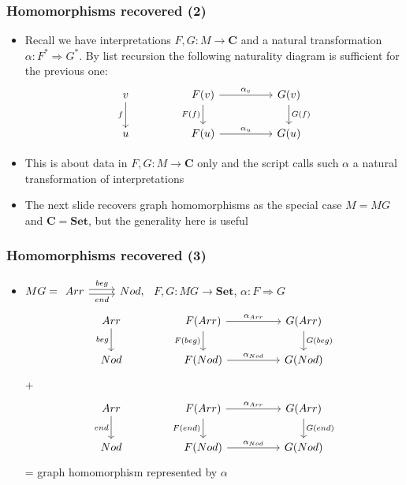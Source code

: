 \documentclass[handout]{beamer}
\newcommand{\To}{\Rightarrow}
\newcommand{\bfsf}[1]{{\boldsymbol{#1}}}
\newcommand{\Set}{\bfsf{Set}}
\newcommand{\CC}{\bfsf{C}}
\begin{document}
\frame
  {   
    \frametitle{Homomorphisms recovered (2)}\label{Ch3:Homs2}

 \begin{itemize}[<+->]
\item Recall we have {interpretations} $F,G : M\to \CC$ and a natural transformation
$\alpha: F^* \To G^*$. By list recursion the following
naturality diagram is sufficient for the previous one:
\[
\begin{tikzcd}[ampersand replacement=\&]
v \arrow[swap]{d}{f} \&\& {F(v)}  \arrow[swap]{d}{F(f)}\arrow{rr}{\alpha_v} 
\&\& {G(v})\arrow{d}{G(f)}\\
u \&\&{F(u)}  \arrow{rr}{\alpha_u}\& \& {G(u)}
\end{tikzcd}
\]
\item This is about data in $F,G : M\to \CC$ only and the script calls 
such $\alpha$ a natural transformation of interpretations
\item The next slide recovers graph homomorphisms as
the special case $M=MG$ and $\CC=\Set$, but the generality here is useful
 \end{itemize}

 }

\frame
  {   
    \frametitle{Homomorphisms recovered (3)}\label{Ch3:Homs3}

 \begin{itemize}[<+->]
\item $MG = 
\begin{tikzcd}[ampersand replacement=\&]
Arr \arrow[yshift=0.5ex]{r}{beg} \arrow[swap, yshift=-0.5ex]{r}{end} \& Nod,
\end{tikzcd} $ $F,G: MG\to\Set$, $\alpha:F\To G$
\[
\begin{tikzcd}[ampersand replacement=\&]
Arr \arrow[swap]{d}{beg} \&\& {F(Arr)}  \arrow[swap]{d}{F(beg)}\arrow{rr}{\alpha_{Arr}} 
\&\& {G(Arr})\arrow{d}{G(beg)}\\
Nod \&\&{F(Nod)}  \arrow{rr}{\alpha_{Nod}}\& \& {G(Nod)}
\end{tikzcd}
\]
+
\[
\begin{tikzcd}[ampersand replacement=\&]
Arr \arrow[swap]{d}{end} \&\& {F(Arr)}  \arrow[swap]{d}{F(end)}\arrow{rr}{\alpha_{Arr}} 
\&\& {G(Arr})\arrow{d}{G(end)}\\
Nod \&\&{F(Nod)}  \arrow{rr}{\alpha_{Nod}}\& \& {G(Nod)}
\end{tikzcd}
\]
= graph homomorphism represented by $\alpha$ 
 \end{itemize}

 }
\end{document}

